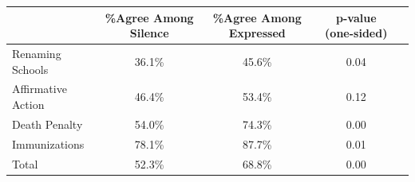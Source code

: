 \begin{tabular}{l*{4}c}\toprule 
& \%Agree Among Silence & \%Agree Among Expressed & p-value (one-sided) \\
\midrule
Renaming Schools & 36.1\% & 45.6\% & 0.04 \\
Affirmative Action & 46.4\% & 53.4\% & 0.12 \\
Death Penalty & 54.0\% & 74.3\% & 0.00 \\
Immunizations & 78.1\% & 87.7\% & 0.01 \\
\midrule
Total & 52.3\% & 68.8\% & 0.00 \\
\bottomrule
\end{tabular}
